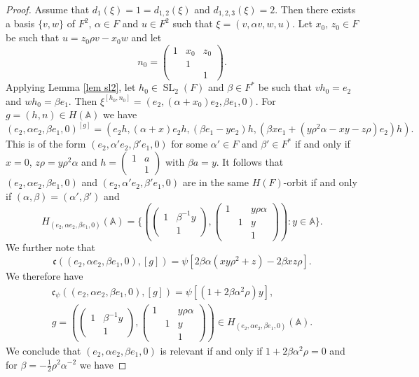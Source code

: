 \documentclass[12pt]{amsart}
\newcommand{\SL}{\operatorname{SL}}
\newcommand{\A}{\mathbb{A}}
\newcommand{\sm}[4]{\left(\begin{smallmatrix}{#1}&{#2}\\{#3}&{#4}\end{smallmatrix}\right)}
\renewcommand{\c}{\mathfrak{c}}
\theoremstyle{remark}
\begin{document}
\begin{proof}
Assume that $d_1(\xi)=1=d_{1,2}(\xi)$ and $d_{1,2,3}(\xi)=2$. Then there exists a basis $\{v,w\}$ of $F^2$, $\alpha\in F$ and $u\in F^2$ such that $\xi=(v,\alpha v,w,u)$. 
Let $x_0,\,z_0\in F$ be such that $u=z_0\rho v-x_0 w$ and let
\[
n_0=\begin{pmatrix}
1 & x_0 & z_0 \\  & 1 &  \\ & & 1
\end{pmatrix}.
\]
Applying Lemma \ref{lem sl2}, let $h_0\in \SL_2(F)$ and $\beta\in F^*$ be such that $vh_0=e_2$ and $wh_0=\beta e_1$.
Then $\xi^{[h_0,n_0]}=(e_2,(\alpha+x_0)e_2,\beta e_1,0)$.
For $g=(h,n)\in H(\A)$ we have
\[
(e_2,\alpha e_2,\beta e_1,0)^{[g]}=(e_2 h,(\alpha+x)e_2h,(\beta e_1-ye_2)h,(\beta x e_1+(y\rho^2\alpha-xy-z\rho) e_2)h).
\]
This is of the form $(e_2,\alpha' e_2,\beta' e_1,0)$ for some $\alpha'\in F$ and $\beta'\in F^*$ if and only if $x=0$, $z\rho=y\rho^2\alpha$ and $h=\sm{1}{a}{}{1}$ with $\beta a=y$.
It follows that $(e_2,\alpha e_2,\beta e_1,0)$ and $(e_2,\alpha' e_2,\beta' e_1,0)$ are in the same $H(F)$-orbit if and only if $(\alpha,\beta)=(\alpha',\beta')$ and
\[
H_{(e_2,\alpha e_2,\beta e_1,0)}(\A)=\{  (\begin{pmatrix} 1 & \beta^{-1}y \\  & 1 \end{pmatrix},    \begin{pmatrix}
1 &  & y\rho\alpha\\  & 1 & y \\ & & 1
\end{pmatrix}):y\in \A  \}.
\]
We further note that
\[
\c((e_2,\alpha e_2,\beta e_1,0),[g])=\psi[2\beta\alpha (xy\rho^2+z)-2\beta xz\rho].
\]
We therefore have
\begin{multline*}
\c_\psi((e_2,\alpha e_2,\beta e_1,0),[g])=\psi[(1+2\beta\alpha^2\rho)y],\\ g=(\begin{pmatrix} 1 & \beta^{-1}y \\  & 1 \end{pmatrix},    \begin{pmatrix}
1 &  & y\rho\alpha\\  & 1 & y \\ & & 1
\end{pmatrix})\in H_{(e_2,\alpha e_2,\beta e_1,0)}(\A).
\end{multline*}
We conclude that $(e_2,\alpha e_2,\beta e_1,0)$ is relevant if and only if $1+2\beta\alpha^2\rho=0$ and for $\beta=-\frac12 \rho^2\alpha^{-2}$ we have

\end{proof}
\end{document}
